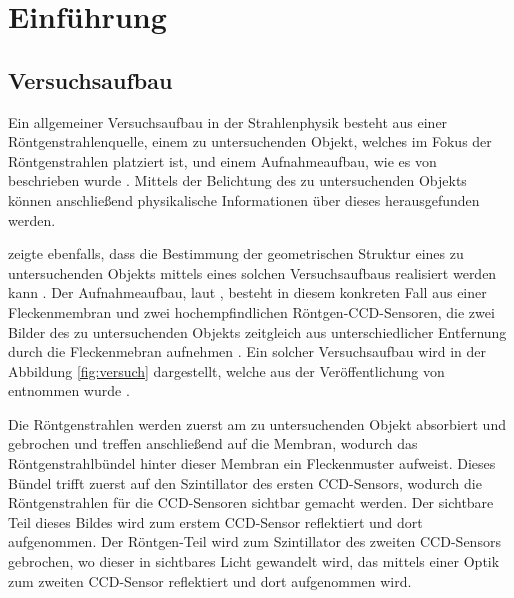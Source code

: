 \section{Einführung}

\subsection{Versuchsaufbau}

Ein allgemeiner Versuchsaufbau in der Strahlenphysik besteht aus einer Röntgenstrahlenquelle, einem zu untersuchenden Objekt, welches im Fokus der Röntgenstrahlen platziert ist, und einem Aufnahmeaufbau, wie es von \citeauthor{Ber13} beschrieben wurde . Mittels der Belichtung des zu untersuchenden Objekts können anschließend physikalische Informationen über dieses herausgefunden werden.

\citeauthor{Ber13} zeigte ebenfalls, dass die Bestimmung der geometrischen Struktur eines zu untersuchenden Objekts mittels eines solchen Versuchsaufbaus realisiert werden kann . Der Aufnahmeaufbau, laut \citeauthor{Ber15}, besteht in diesem konkreten Fall aus einer Fleckenmembran und zwei hochempfindlichen Röntgen-\gls{CCD}-Sensoren, die zwei Bilder des zu untersuchenden Objekts zeitgleich aus unterschiedlicher Entfernung durch die Fleckenmebran aufnehmen . Ein solcher Versuchsaufbau wird in der Abbildung \ref{fig:versuch} dargestellt, welche aus der Veröffentlichung \cite{Ber15} von \citeauthor{Ber15} entnommen wurde \cite{Ber15}.

Die Röntgenstrahlen werden zuerst am zu untersuchenden Objekt absorbiert und gebrochen und treffen anschließend auf die Membran, wodurch das Röntgenstrahlbündel hinter dieser Membran ein Fleckenmuster aufweist. Dieses Bündel trifft zuerst auf den Szintillator des ersten \gls{CCD}-Sensors, wodurch die Röntgenstrahlen für die \gls{CCD}-Sensoren sichtbar gemacht werden. Der sichtbare Teil dieses Bildes wird zum erstem \gls{CCD}-Sensor reflektiert und dort aufgenommen. Der Röntgen-Teil wird zum Szintillator des zweiten \gls{CCD}-Sensors gebrochen, wo dieser in sichtbares Licht gewandelt wird, das mittels einer Optik zum zweiten \gls{CCD}-Sensor reflektiert und dort aufgenommen wird. 

